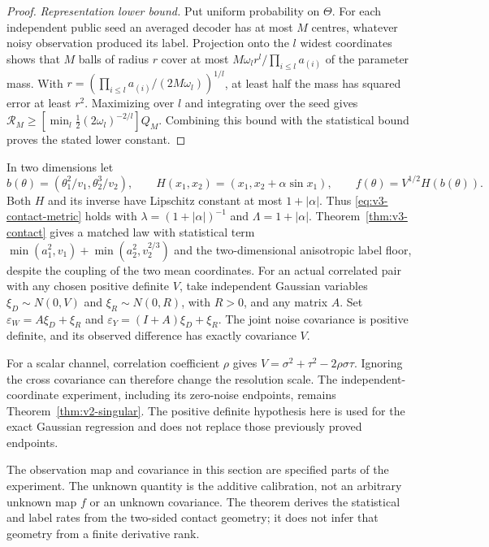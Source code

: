 \begin{proof}
\emph{Representation lower bound.} Put uniform probability on $\Theta$.
For each independent public seed an averaged decoder has at most $M$
centres, whatever noisy observation produced its label. Projection onto
the $l$ widest coordinates shows that $M$ balls of radius $r$ cover at
most $M\omega_l r^l/\prod_{i\le l}a_{(i)}$ of the parameter mass.
With $r=(\prod_{i\le l}a_{(i)}/(2M\omega_l))^{1/l}$, at least half
the mass has squared error at least $r^2$. Maximizing over $l$ and
integrating over the seed gives
$\mathcal R_M\ge[\min_l\tfrac12(2\omega_l)^{-2/l}]Q_M$.
Combining this bound with the statistical bound proves the stated lower
constant.
\end{proof}

\begin{example}\label{ex:v3-coupled}
In two dimensions let
\[
 b(\theta)=(\theta_1^2/v_1,\theta_2^3/v_2),\qquad
 H(x_1,x_2)=(x_1,x_2+\alpha\sin x_1),\qquad
 f(\theta)=V^{1/2}H(b(\theta)).
\]
Both $H$ and its inverse have Lipschitz constant at most $1+|\alpha|$.
Thus \eqref{eq:v3-contact-metric} holds with
$\lambda=(1+|\alpha|)^{-1}$ and $\Lambda=1+|\alpha|$.
Theorem~\ref{thm:v3-contact} gives a matched law with statistical term
$\min(a_1^2,v_1)+\min(a_2^2,v_2^{2/3})$ and the two-dimensional
anisotropic label floor, despite the coupling of the two mean coordinates.
For an actual correlated pair with any chosen positive definite $V$, take
independent Gaussian variables $\xi_D\sim N(0,V)$ and
$\xi_R\sim N(0,R)$, with $R>0$, and any matrix $A$. Set
$\varepsilon_W=A\xi_D+\xi_R$ and
$\varepsilon_Y=(I+A)\xi_D+\xi_R$. The joint noise covariance is
positive definite, and its observed difference has exactly covariance $V$.
\end{example}

For a scalar channel, correlation coefficient $\rho$ gives
$V=\sigma^2+\tau^2-2\rho\sigma\tau$. Ignoring the cross covariance
can therefore change the resolution scale. The independent-coordinate
experiment, including its zero-noise endpoints, remains
Theorem~\ref{thm:v2-singular}. The positive definite hypothesis here is
used for the exact Gaussian regression and does not replace those
previously proved endpoints.

The observation map and covariance in this section are specified parts
of the experiment. The unknown quantity is the additive calibration,
not an arbitrary unknown map $f$ or an unknown covariance. The theorem
derives the statistical and label rates from the two-sided contact
geometry; it does not infer that geometry from a finite derivative rank.

